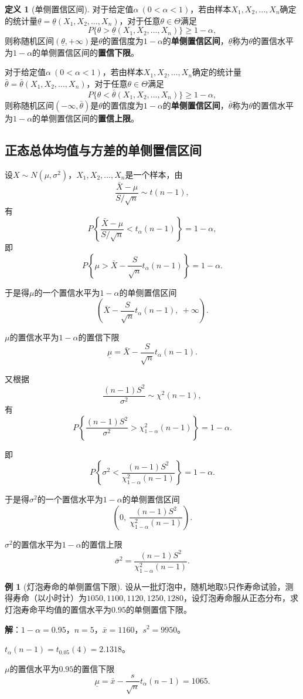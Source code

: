 \documentclass[11pt,a4paper]{report}
\theoremstyle{definition}
\newtheorem{definition}{定义}[chapter]
\newtheorem{example}{例}[chapter]
\begin{document}
\begin{definition}[单侧置信区间]
对于给定值$\alpha\ (0<\alpha<1)$，若由样本$X_{1},X_{2},\ldots,X_{n}$确定的统计量$\underline{\theta}=\underline{\theta}(X_{1},X_{2},\ldots,X_{n})$，对于任意$\theta\in\Theta$满足
\[
P\{\theta>\underline{\theta}(X_{1},X_{2},\ldots,X_{n})\}\geq1-\alpha,
\]
则称随机区间$(\underline{\theta},+\infty)$是$\theta$的置信度为$1-\alpha$的\textbf{单侧置信区间}，$\underline{\theta}$称为$\theta$的置信水平为$1-\alpha$的单侧置信区间的\textbf{置信下限}。

对于给定值$\alpha\ (0<\alpha<1)$，若由样本$X_{1},X_{2},\ldots,X_{n}$确定的统计量$\bar{\theta}=\bar{\theta}(X_{1},X_{2},\ldots,X_{n})$，对于任意$\theta\in\Theta$满足
\[
P\{\theta<\bar{\theta}(X_{1},X_{2},\ldots,X_{n})\}\geq1-\alpha,
\]
则称随机区间$(-\infty,\bar{\theta})$是$\theta$的置信度为$1-\alpha$的\textbf{单侧置信区间}，$\bar{\theta}$称为$\theta$的置信水平为$1-\alpha$的单侧置信区间的\textbf{置信上限}。
\end{definition}

\subsection{正态总体均值与方差的单侧置信区间}

设$X\sim N(\mu,\sigma^{2})$，$X_{1},X_{2},\ldots,X_{n}$是一个样本，由
\[
\frac{\bar{X}-\mu}{S/\sqrt{n}}\sim t(n-1),
\]
有
\[
P\left\{\frac{\bar{X}-\mu}{S/\sqrt{n}}<t_{\alpha}(n-1)\right\}=1-\alpha,
\]
即
\[
P\left\{\mu>\bar{X}-\frac{S}{\sqrt{n}}t_{\alpha}(n-1)\right\}=1-\alpha.
\]

于是得$\mu$的一个置信水平为$1-\alpha$的单侧置信区间
\[
\left(\bar{X}-\frac{S}{\sqrt{n}}t_{\alpha}(n-1),\ +\infty\right).
\]

$\mu$的置信水平为$1-\alpha$的置信下限
\[
\underline{\mu}=\bar{X}-\frac{S}{\sqrt{n}}t_{\alpha}(n-1).
\]

又根据
\[
\frac{(n-1)S^{2}}{\sigma^{2}}\sim\chi^{2}(n-1),
\]
有
\[
P\left\{\frac{(n-1)S^{2}}{\sigma^{2}}>\chi_{1-\alpha}^{2}(n-1)\right\}=1-\alpha.
\]

即
\[
P\left\{\sigma^{2}<\frac{(n-1)S^{2}}{\chi_{1-\alpha}^{2}(n-1)}\right\}=1-\alpha.
\]

于是得$\sigma^{2}$的一个置信水平为$1-\alpha$的单侧置信区间
\[
\left(0,\ \frac{(n-1)S^{2}}{\chi_{1-\alpha}^{2}(n-1)}\right).
\]

$\sigma^{2}$的置信水平为$1-\alpha$的置信上限
\[
\bar{\sigma}^{2}=\frac{(n-1)S^{2}}{\chi_{1-\alpha}^{2}(n-1)}.
\]

\begin{example}[灯泡寿命的单侧置信下限]
设从一批灯泡中，随机地取$5$只作寿命试验，测得寿命（以小时计）为$1050,1100,1120,1250,1280$，设灯泡寿命服从正态分布，求灯泡寿命平均值的置信水平为$0.95$的单侧置信下限。

\textbf{解}：$1-\alpha=0.95$，$n=5$，$\bar{x}=1160$，$s^{2}=9950$。

$t_{\alpha}(n-1)=t_{0.05}(4)=2.1318$。

$\mu$的置信水平为$0.95$的置信下限
\[
\underline{\mu}=\bar{x}-\frac{s}{\sqrt{n}}t_{\alpha}(n-1)=1065.
\]
\end{example}
\end{document}
